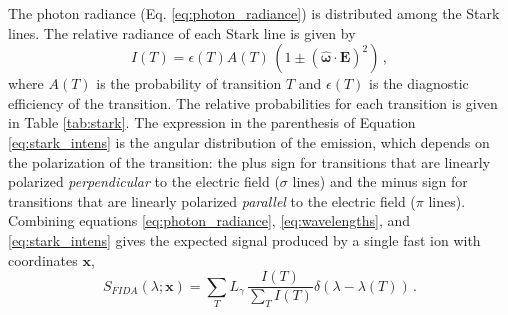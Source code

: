 The photon radiance (Eq. \ref{eq:photon_radiance}) is distributed among the Stark lines.
The relative radiance of each Stark line is given by
\begin{equation}\label{eq:stark_intens}
I(T) = \epsilon(T) A(T)\,(1 \pm (\boldsymbol{\hat{\omega}} \cdot \mathbf{E})^2)\,,
\end{equation}
where $A(T)$ is the probability of transition $T$ and $\epsilon(T)$ is the diagnostic efficiency of the transition. The relative probabilities for each transition is given in Table \ref{tab:stark}. The expression in the parenthesis of Equation \ref{eq:stark_intens} is the angular distribution of the emission, which depends on the polarization of the transition: the plus sign for transitions that are linearly polarized \textit{perpendicular} to the electric field ($\sigma$ lines) and the minus sign for transitions that are linearly polarized \textit{parallel} to the electric field ($\pi$ lines).
Combining equations \ref{eq:photon_radiance}, \ref{eq:wavelengths}, and \ref{eq:stark_intens} gives the expected signal produced by a single fast ion with coordinates $\mathbf{x}$,
\begin{equation}\label{eq:fida_weight}
    S_{FIDA}(\lambda;\mathbf{x}) = \sum_T L_{\gamma}\, \frac{I(T)}{\sum_T I(T)} \delta(\lambda - \lambda(T)) \,.
\end{equation}
